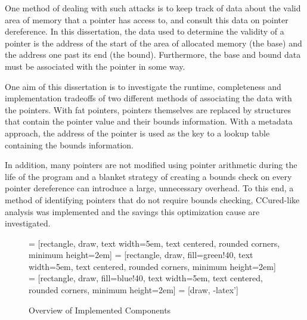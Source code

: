 \documentclass[a4paper,12pt,twoside,openright]{report}
\begin{document}
One method of dealing with such attacks is to keep track of data about the valid area of memory that a pointer has access to, and consult this data on pointer dereference.
In this dissertation, the data used to determine the validity of a pointer is the address of the start of the area of allocated memory (the base) and the address one past its end (the bound).
Furthermore, the base and bound data must be associated with the pointer in some way.

One aim of this dissertation is to investigate the runtime, completeness and implementation tradeoffs of two different methods of associating the data with the pointers.
With fat pointers, pointers themselves are replaced by structures that contain the pointer value and their bounds information.
With a metadata approach, the address of the pointer is used as the key to a lookup table containing the bounds information.

In addition, many pointers are not modified using pointer arithmetic during the life of the program and a blanket strategy of creating a bounds check on every pointer dereference can introduce a large, unnecessary overhead.
To this end, a method of identifying pointers that do not require bounds checking, CCured-like analysis was implemented and the savings this optimization cause are investigated.

\begin{figure}
\centering
{} = [rectangle, draw, 
text width=5em, text centered, rounded corners, minimum height=2em]
 = [rectangle, draw, fill=green!40, 
text width=5em, text centered, rounded corners, minimum height=2em]
 = [rectangle, draw, fill=blue!40, 
text width=5em, text centered, rounded corners, minimum height=2em]
 = [draw, -latex']
\caption{Overview of Implemented Components}
\label{fig:Components}
\end{figure}
\end{document}
